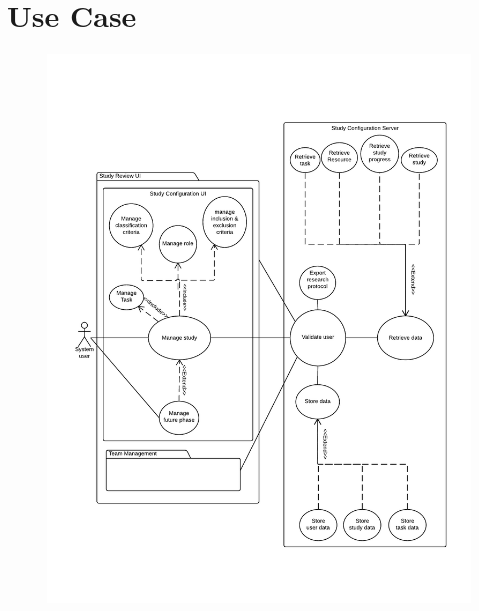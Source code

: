 \section{Use Case}







\begin{figure}
  \includegraphics{section/UseCaseDiagram}
  \label{fig:Use Case 1}
\end{figure}